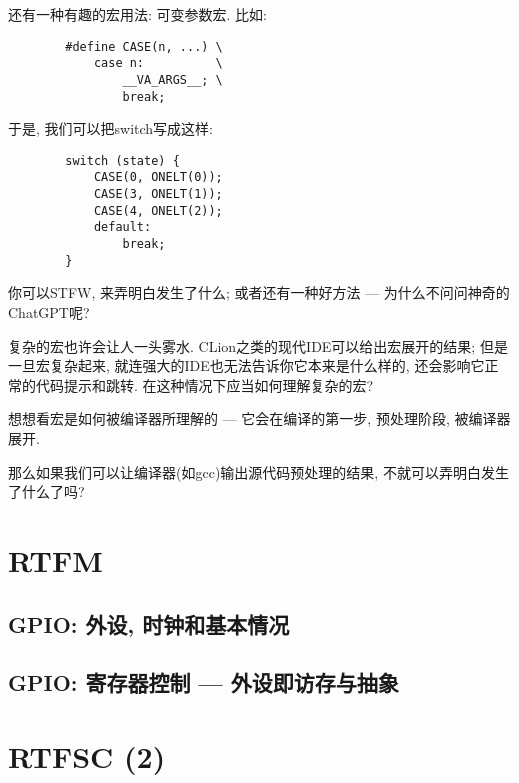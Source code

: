 \begin{definition}
	还有一种有趣的宏用法: 可变参数宏. 比如:
	\begin{lstlisting}
		#define CASE(n, ...) \
		    case n:          \
		        __VA_ARGS__; \
		        break;
	\end{lstlisting}
	于是, 我们可以把switch写成这样:
	\begin{lstlisting}
        switch (state) {
            CASE(0, ONELT(0));
            CASE(3, ONELT(1));
            CASE(4, ONELT(2));
            default:
                break;
        }
    \end{lstlisting}
	你可以STFW, 来弄明白发生了什么; 或者还有一种好方法 --- 为什么不问问神奇的ChatGPT呢?
\end{definition}
\begin{definition}
	复杂的宏也许会让人一头雾水. CLion之类的现代IDE可以给出宏展开的结果; 但是一旦宏复杂起来, 就连强大的IDE也无法告诉你它本来是什么样的, 还会影响它正常的代码提示和跳转. 在这种情况下应当如何理解复杂的宏?

	想想看宏是如何被编译器所理解的 --- 它会在编译的第一步, 预处理阶段, 被编译器展开.

	那么如果我们可以让编译器(如gcc)输出源代码预处理的结果, 不就可以弄明白发生了什么了吗?
\end{definition}

\section{RTFM}
\subsection{GPIO: 外设, 时钟和基本情况}
\subsection{GPIO: 寄存器控制 --- 外设即访存与抽象}

\section{RTFSC (2)}

